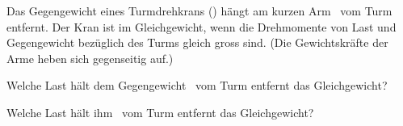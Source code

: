 Das Gegengewicht eines Turmdrehkrans (\mGO) hängt am kurzen Arm \cGO\ vom Turm entfernt. Der Kran ist im Gleichgewicht, wenn die Drehmomente von Last und Gegengewicht bezüglich des Turms gleich gross sind. (Die Gewichtskräfte der Arme heben sich gegenseitig auf.)

\begin{abcliste}
\abc
Welche Last hält dem Gegengewicht \raO\ vom Turm entfernt das Gleichgewicht?

\abc
Welche Last hält ihm \rbO\ vom Turm entfernt das Gleichgewicht?
\end{abcliste}
